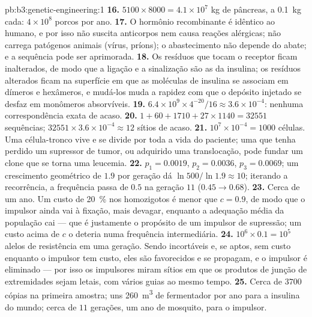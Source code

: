 \begin{solution}{pb:b3:genetic-engineering:1}
\textbf{16.} $5100\times 8000 = 4.1\times 10^{7}$ kg de pâncreas, a
\qty{0.1}{kg} cada: $4\times 10^{8}$ porcos por ano.
\textbf{17.} O hormônio recombinante é idêntico ao humano, e por isso
não suscita anticorpos nem causa reações alérgicas; não carrega
patógenos animais (vírus, príons); o abastecimento não depende do
abate; e a sequência pode ser aprimorada.
\textbf{18.} Os resíduos que tocam o receptor ficam inalterados, de modo
que a ligação e a sinalização são as da insulina; os resíduos alterados
ficam na superfície em que as moléculas de insulina se associam em
dímeros e hexâmeros, e mudá-los muda a rapidez com que o depósito
injetado se desfaz em monômeros absorvíveis.
\textbf{19.} $6.4\times 10^{9}\times 4^{-20}/16 \approx 3.6\times
10^{-4}$: nenhuma correspondência exata de acaso.
\textbf{20.} $1 + 60 + 1710 + 27\times 1140 = \num{32551}$ sequências;
$\num{32551}\times 3.6\times 10^{-4} \approx 12$ sítios  de
acaso.
\textbf{21.} $10^{7}\times 10^{-4} = 1000$ células. Uma célula-tronco
vive e se divide por toda a vida do paciente; uma que tenha perdido um
supressor de tumor, ou adquirido uma translocação, pode fundar um clone
que se torna uma leucemia.
\textbf{22.} $p_{1} = 0.0019$, $p_{2} = 0.0036$, $p_{3} = 0.0069$; um
crescimento geométrico de $1.9$ por geração dá $\ln 500/\ln 1.9
\approx 10$; iterando a recorrência, a frequência passa de $0.5$ na
geração $11$ ($0.45 \to 0.68$).
\textbf{23.} Cerca de um ano. Um custo de \qty{20}{\%} nos homozigotos é
menor que $c = 0.9$, de modo que o impulsor ainda vai à fixação, mais
devagar, enquanto a adequação média da população cai --- que é
justamente o propósito de um impulsor de supressão; um custo acima de
$c$ o deteria numa frequência intermediária.
\textbf{24.} $10^{6}\times 0.1 = 10^{5}$ alelos de resistência em uma
geração. Sendo incortáveis e, se aptos, sem custo enquanto o impulsor
tem custo, eles são favorecidos e se propagam, e o impulsor é
eliminado --- por isso os impulsores miram sítios em que os produtos de
junção de extremidades sejam letais, com vários guias ao mesmo tempo.
\textbf{25.} Cerca de $3700$ cópias na primeira amostra; uns
\qty{260}{m^3} de fermentador por ano para a insulina do mundo; cerca
de $11$ gerações, um ano de mosquito, para o impulsor.
\end{solution}
